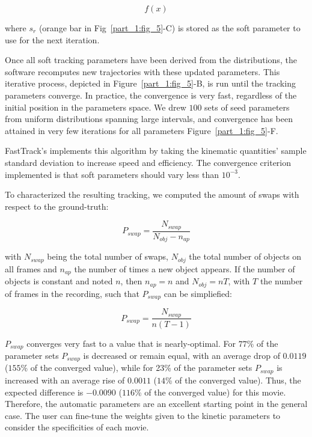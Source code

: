         \begin{equation}
    f(x)
        \label{eq:fit_chi}
        \end{equation}

        where $s_r$ (orange bar in Fig~\ref{part_1:fig_5}-C) is stored as the soft parameter to use for the next iteration.

        Once all soft tracking parameters have been derived from the distributions, the software recomputes new trajectories with these updated parameters. This iterative process, depicted in Figure~\ref{part_1:fig_5}-B, is run until the tracking parameters converge. In practice, the convergence is very fast, regardless of the initial position in the parameters space. We drew $100$ sets of seed parameters from uniform distributions spanning large intervals, and convergence has been attained in very few iterations for all parameters Figure~\ref{part_1:fig_5}-F.

        FastTrack's implements this algorithm by taking the kinematic quantities' sample standard deviation to increase speed and efficiency. The convergence criterion implemented is that soft parameters should vary less than $10^{-3}$.

        To characterized the resulting tracking, we computed the amount of swaps with respect to the ground-truth:

        \begin{equation}
        P_{swap} = \frac{N_{swap}}{N_{obj} - n_{ap}}
        \label{eq:Pswap}
        \end{equation}

        with $N_{swap}$ being the total number of swaps, $N_{obj}$ the total number of objects on all frames and $n_{ap}$ the number of times a new object appears. If the number of objects is constant and noted $n$, then $n_{ap} = n$ and $N_{obj} = nT$, with $T$ the number of frames in the recording, such that $P_{swap}$ can be simpliefied:

        \begin{equation}
        P_{swap} = \frac{N_{swap}}{n(T-1)}
        \label{eq:Pswap_constant}
        \end{equation}

        $P_{swap}$ converges very fast to a value that is nearly-optimal. For $77\%$ of the parameter sets $P_{swap}$ is decreased or remain equal, with an average drop of $0.0119$ ($155$\% of the converged value), while for 23\% of the parameter sets $P_{swap}$ is increased with an average rise of $0.0011$ ($14$\% of the converged value). Thus, the expected difference is $-0.0090$ ($116$\% of the converged value) for this movie. Therefore, the automatic parameters are an excellent starting point in the general case. The user can fine-tune the weights given to the kinetic parameters to consider the specificities of each movie.

